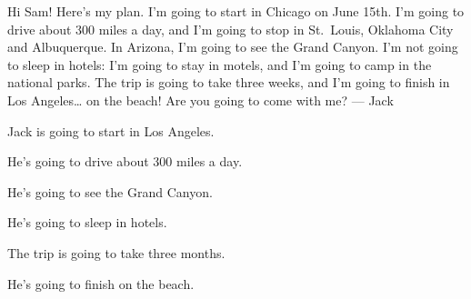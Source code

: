 \begin{center}\otRouteSoixanteSix\end{center}
\begin{anglais}
\begin{tcolorbox}[otBase,colback=white,colframe=otRule,boxrule=0.5pt,fontupper=\fontsize{10.6}{14.2}\selectfont]
Hi Sam! Here's my plan. I'm going to start in Chicago on June 15th. I'm going to drive about 300
miles a day, and I'm going to stop in St.\ Louis, Oklahoma City and Albuquerque. In Arizona, I'm going
to see the Grand Canyon. I'm not going to sleep in hotels: I'm going to stay in motels, and I'm going
to camp in the national parks. The trip is going to take three weeks, and I'm going to finish in Los
Angeles… on the beach! Are you going to come with me? — Jack
\end{tcolorbox}
\begin{questions}[2]
\item Jack is going to start in Los Angeles. \hfill{}
\item He's going to drive about 300 miles a day. \hfill{}
\item He's going to see the Grand Canyon. \hfill{}
\item He's going to sleep in hotels. \hfill{}
\item The trip is going to take three months. \hfill{}
\item He's going to finish on the beach. \hfill{}
\end{questions}
\end{anglais}

\begin{questions}[3]
\item {}\quad{}
\item {}\quad{}
\item {}\quad{}
\item {}\quad{}
\item {}\quad{}
\item {}\quad{}
\end{questions}

